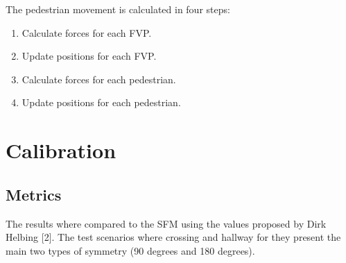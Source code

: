 \documentclass[english]{article}
\numberwithin{equation}{section}
\numberwithin{figure}{section}
\begin{document}
The pedestrian movement is calculated in four steps:
\begin{enumerate}
\item Calculate forces for each FVP.
\item Update positions for each FVP.
\item Calculate forces for each pedestrian.
\item Update positions for each pedestrian.
\end{enumerate}

\section{Calibration}


\subsection{Metrics}

The results where compared to the SFM using the values proposed by
Dirk Helbing {[}2{]}. The test scenarios where crossing and hallway
for they present the main two types of symmetry (90 degrees and 180
degrees).
\end{document}
